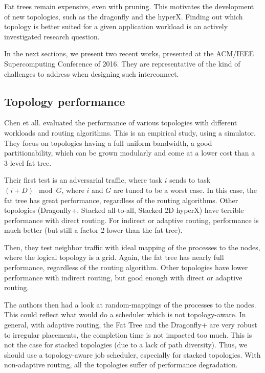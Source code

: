 \documentclass[12pt, a4paper]{memoir}
\begin{document}
Fat trees remain expensive, even with pruning. This motivates the development of new topologies, such as the
dragonfly\cite{Kim:2008:THD:1381306.1382129} and the hyperX\cite{Ahn:2009:HTR:1654059.1654101}. Finding out which
topology is better suited for a given application workload is an actively investigated research question.

In the next sections, we present two recent works, presented at the ACM/IEEE Supercomputing Conference of 2016. They
are representative of the kind of challenges to address when designing such interconnect.

\subsection{Topology performance}
\label{sec:org848cf2d}
Chen et all.\cite{Chen:2016:ENA:3019057.3019059} evaluated the performance of various topologies with different
workloads and routing algorithms. This is an empirical study, using a simulator.
They focus on topologies having a full uniform bandwidth, a good partitionability, which can be grown modularly and
come at a lower cost than a 3-level fat tree.


Their first test is an adversarial traffic, where task \(i\) sends to task \((i+D) \mod G\), where \(i\) and \(G\) are tuned
to be a worst case. In this case, the fat tree has great performance, regardless of the routing algorithms. Other
topologies (Dragonfly+, Stacked all-to-all, Stacked 2D hyperX) have terrible performance with direct routing. For
indirect or adaptive routing, performance is much better (but still a factor 2 lower than the fat tree).

Then, they test neighbor traffic with ideal mapping of the processes to the nodes, where the logical topology is a
grid. Again, the fat tree has nearly full performance, regardless of the routing algorithm. Other topologies have
lower performance with indirect routing, but good enough with direct or adaptive routing.

The authors then had a look at random-mappings of the processes to the nodes. This could reflect what would do a
scheduler which is not topology-aware.  In general, with adaptive routing, the Fat Tree and the Dragonfly+ are very
robust to irregular placements, the completion time is not impacted too much. This is not the case for stacked
topologies (due to a lack of path diversity). Thus, we should use a topology-aware job scheduler, especially for
stacked topologies.  With non-adaptive routing, all the topologies suffer of performance degradation.
\end{document}
